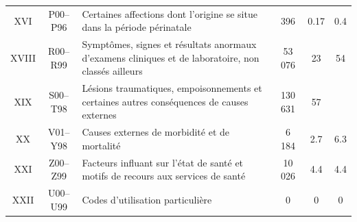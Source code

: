 \documentclass[12pt,english,french,twoside]{book}\usepackage[]{graphicx}\usepackage[]{color}
\begin{document}
\begin{longtable}{|c|c|m{4cm}|c|c|c|}
XVI&P00–P96&Certaines affections dont l'origine se situe dans la période périnatale&396&0.17&0.4\\


XVIII&R00–R99&Symptômes, signes et résultats anormaux d'examens cliniques et de laboratoire, non classés ailleurs&53 076&23&54\\

XIX&S00–T98&Lésions traumatiques, empoisonnements et certaines autres conséquences de causes externes&130 631&57& \\

XX&V01–Y98&Causes externes de morbidité et de mortalité& 6 184&2.7&6.3\\

XXI&Z00–Z99&Facteurs influant sur l'état de santé et motifs de recours aux services de santé&10 026&4.4&4.4\\

XXII&U00–U99&Codes d'utilisation particulière & 0&0&0\\

  \hline
\end{longtable}
\end{document}
